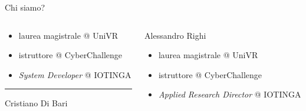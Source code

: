 \documentclass[12pt]{beamer}
\begin{document}
\begin{frame}{Chi siamo?}
\begin{columns}[T] %
\begin{column}{.48\textwidth}
\begin{itemize}
\item laurea magistrale @ UniVR
\item istruttore @ CyberChallenge
\item \textit{System Developer} @ IOTINGA
\end{itemize}        
{\color{blue}\rule{\linewidth}{2pt}}%
\begin{center}
Cristiano Di Bari
\end{center}
\end{column}%
\hfill%
\begin{column}{.48\textwidth}%
\begin{center}%

Alessandro Righi
\color{blue}{\rule{\linewidth}{2pt}}%
\begin{itemize}
\item laurea magistrale @ UniVR
\item istruttore @ CyberChallenge
\item \textit{Applied Research Director} @ IOTINGA
\end{itemize}
\end{center}
\end{column}%
\end{columns}
\end{frame}
\end{document}
